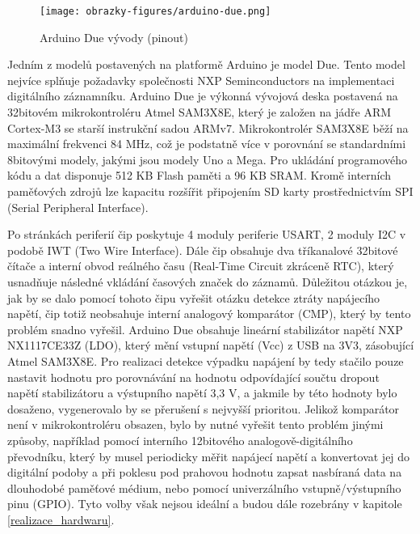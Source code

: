 \begin{figure}[h]
    \centering
    \texttt{[image: obrazky-figures/arduino-due.png]}
    
    \caption{Arduino Due vývody (pinout) \cite{arduino_shop_due}}
    \label{fig:arduino-due-pinout}
\end{figure}


Jedním z modelů postavených na platformě Arduino je model Due. Tento model nejvíce splňuje požadavky společnosti NXP Seminconductors na implementaci digitálního záznamníku. Arduino Due je výkonná vývojová deska postavená na 32bitovém mikrokontroléru Atmel SAM3X8E, který je založen na jádře ARM Cortex-M3 se starší instrukční sadou ARMv7. Mikrokontrolér SAM3X8E běží na maximální frekvenci 84 MHz, což je podstatně více v porovnání se  standardními 8bitovými modely, jakými jsou modely Uno a Mega. Pro ukládání programového kódu a dat disponuje 512 KB Flash paměti a 96 KB SRAM. Kromě interních paměťových zdrojů lze kapacitu rozšířit připojením SD karty prostřednictvím SPI (Serial Peripheral Interface). \cite{arduino_shop_due, arduino_shop_due}

Po stránkách periferií čip poskytuje 4 moduly periferie USART, 2 moduly I2C v podobě IWT (Two Wire Interface). Dále čip obsahuje dva tříkanalové 32bitové čítače a interní obvod reálného času (Real-Time Circuit zkráceně RTC), který usnadňuje následné vkládání časových značek do záznamů. Důležitou otázkou je, jak by se dalo pomocí tohoto čipu vyřešit otázku detekce ztráty napájecího napětí, čip totiž neobsahuje interní analogový komparátor (CMP), který by tento problém snadno vyřešil. Arduino Due obsahuje lineární stabilizátor napětí NXP NX1117CE33Z (LDO), který mění vstupní napětí (Vcc) z USB na 3V3, zásobující Atmel SAM3X8E. Pro realizaci detekce výpadku napájení by tedy stačilo pouze nastavit hodnotu pro porovnávání na hodnotu odpovídající součtu dropout napětí stabilizátoru a výstupního napětí 3,3 V, a jakmile by této hodnoty bylo dosaženo, vygenerovalo by se přerušení s nejvyšší prioritou. Jelikož komparátor není v mikrokontroléru obsazen, bylo by nutné vyřešit tento problém jinými způsoby, například pomocí interního 12bitového analogově-digitálního převodníku, který by musel periodicky měřit napájecí napětí a konvertovat jej do digitální podoby a při poklesu pod prahovou hodnotu zapsat nasbíraná data na dlouhodobé paměťové médium, nebo pomocí univerzálního vstupně/výstupního pinu (GPIO). Tyto volby však nejsou ideální a budou dále rozebrány v kapitole \ref{realizace_hardwaru}. \cite{arduino_shop_due, nxp_NX1117C_ldo}


